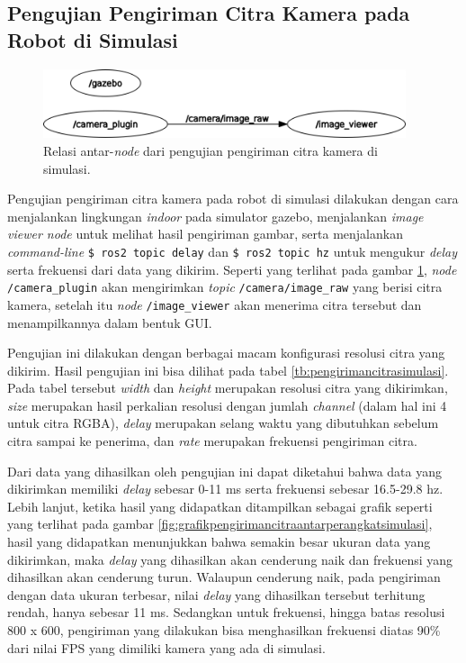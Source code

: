 \subsection{Pengujian Pengiriman Citra Kamera pada Robot di Simulasi}
\label{subsec:citrasimulasi}

\begin{figure}[ht]
  \centering
  \includegraphics[width=0.95\textwidth,keepaspectratio]{gambar/rosgraph-camera-plugin.png}
  \caption{Relasi antar-\emph{node} dari pengujian pengiriman citra kamera di simulasi.}
  \label{fig:rosgraphcameraplugin}
\end{figure}

Pengujian pengiriman citra kamera pada robot di simulasi dilakukan dengan cara menjalankan lingkungan \emph{indoor} pada simulator gazebo,
  menjalankan \emph{image viewer node} untuk melihat hasil pengiriman gambar,
  serta menjalankan \emph{command-line} \lstinline{$ ros2 topic delay} dan \lstinline{$ ros2 topic hz} untuk mengukur \emph{delay} serta frekuensi dari data yang dikirim.
Seperti yang terlihat pada gambar \ref{fig:rosgraphcameraplugin},
  \emph{node} \lstinline{/camera_plugin} akan mengirimkan \emph{topic} \lstinline{/camera/image_raw} yang berisi citra kamera,
  setelah itu \emph{node} \lstinline{/image_viewer} akan menerima citra tersebut dan menampilkannya dalam bentuk GUI.



Pengujian ini dilakukan dengan berbagai macam konfigurasi resolusi citra yang dikirim.
Hasil pengujian ini bisa dilihat pada tabel \ref{tb:pengirimancitrasimulasi}.
Pada tabel tersebut \emph{width} dan \emph{height} merupakan resolusi citra yang dikirimkan,
  \emph{size} merupakan hasil perkalian resolusi dengan jumlah \emph{channel} (dalam hal ini 4 untuk citra RGBA),
  \emph{delay} merupakan selang waktu yang dibutuhkan sebelum citra sampai ke penerima,
  dan \emph{rate} merupakan frekuensi pengiriman citra.



Dari data yang dihasilkan oleh pengujian ini dapat diketahui bahwa data yang dikirimkan memiliki \emph{delay} sebesar 0-11 ms serta frekuensi sebesar 16.5-29.8 hz.
Lebih lanjut, ketika hasil yang didapatkan ditampilkan sebagai grafik seperti yang terlihat pada gambar \ref{fig:grafikpengirimancitraantarperangkatsimulasi},
  hasil yang didapatkan menunjukkan bahwa semakin besar ukuran data yang dikirimkan,
  maka \emph{delay} yang dihasilkan akan cenderung naik dan frekuensi yang dihasilkan akan cenderung turun.
Walaupun cenderung naik, pada pengiriman dengan data ukuran terbesar,
  nilai \emph{delay} yang dihasilkan tersebut terhitung rendah, hanya sebesar 11 ms.
Sedangkan untuk frekuensi,
  hingga batas resolusi 800 x 600,
  pengiriman yang dilakukan bisa menghasilkan frekuensi diatas 90\% dari nilai FPS yang dimiliki kamera yang ada di simulasi.
